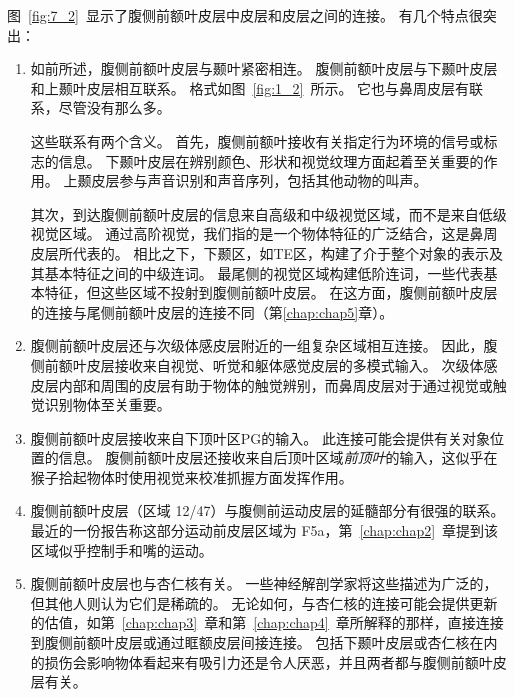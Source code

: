 图~\ref{fig:7_2}~显示了腹侧前额叶皮层中皮层和皮层之间的连接。
有几个特点很突出：
\begin{enumerate}
\item 如前所述，腹侧前额叶皮层与颞叶紧密相连。
腹侧前额叶皮层与下颞叶皮层\cite{ungerleider1989projections,webster1994connections}和上颞叶皮层\cite{seltzer1996overlapping,petrides2002comparative}相互联系。
格式如图~\ref{fig:1_2}~所示。
它也与鼻周皮层有联系\cite{suzuki1994perirhinal,saleem2008complementary}，尽管没有那么多。
\par


这些联系有两个含义。
首先，腹侧前额叶接收有关指定行为环境的信号或标志的信息。
下颞叶皮层在辨别颜色、形状和视觉纹理方面起着至关重要的作用\cite{huxlin2000perceptual}。
上颞皮层参与声音识别\cite{tian2001functional}和声音序列\cite{micheyl2005perceptual}，包括其他动物的叫声\cite{rauschecker1995processing}。 
\par


其次，到达腹侧前额叶皮层的信息来自高级和中级视觉区域，而不是来自低级视觉区域。
通过高阶视觉，我们指的是一个物体特征的广泛结合，这是鼻周皮层所代表的\cite{murray2007visual}。
相比之下，下颞区，如TE区，构建了介于整个对象的表示及其基本特征之间的中级连词\cite{murray2007visual}。
最尾侧的视觉区域构建低阶连词，一些代表基本特征，但这些区域不投射到腹侧前额叶皮层\cite{webster1994connections}。
在这方面，腹侧前额叶皮层的连接与尾侧前额叶皮层的连接不同（第\ref{chap:chap5}章）。

\item 腹侧前额叶皮层还与次级体感皮层附近的一组复杂区域相互连接\cite{petrides2002comparative}。
因此，腹侧前额叶皮层接收来自视觉、听觉和躯体感觉皮层的多模式输入。
次级体感皮层内部和周围的皮层有助于物体的触觉辨别\cite{mishkin1979analogous}，而鼻周皮层对于通过视觉或触觉识别物体至关重要\cite{goulet2001neural,murray2007visual}。

\item 腹侧前额叶皮层接收来自下顶叶区PG的输入\cite{petrides2002comparative}。
此连接可能会提供有关对象位置的信息。
腹侧前额叶皮层还接收来自后顶叶区域\textit{前顶叶}的输入，这似乎在猴子拾起物体时使用视觉来校准抓握方面发挥作用\cite{fogassi2001cortical}。

\item 腹侧前额叶皮层（区域 12/47）与腹侧前运动皮层的延髓部分有很强的联系。 
最近的一份报告称这部分运动前皮层区域为 F5a\cite{gerbella2011cortical}，第~\ref{chap:chap2}~章提到该区域似乎控制手和嘴的运动。 

\item 腹侧前额叶皮层也与杏仁核有关。
一些神经解剖学家将这些描述为广泛的\cite{amaral1984amygdalo,stefanacci2002some}，但其他人则认为它们是稀疏的\cite{carmichael1995limbic,price2010neurocircuitry}。
无论如何，与杏仁核的连接可能会提供更新的估值，如第~\ref{chap:chap3}~章和第~\ref{chap:chap4}~章所解释的那样，直接连接到腹侧前额叶皮层或通过眶额皮层间接连接。
包括下颞叶皮层\cite{horel1975partial}或杏仁核\cite{horel1975partial}在内的损伤会影响物体看起来有吸引力还是令人厌恶，并且两者都与腹侧前额叶皮层有关。
\end{enumerate}



